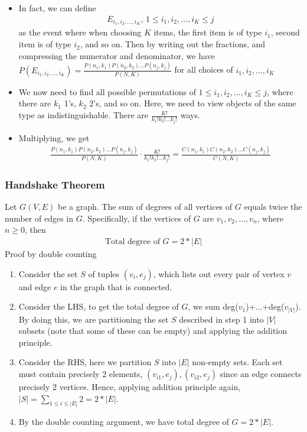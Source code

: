 \documentclass{article}
\begin{document}
\begin{enumerate}
\begin{itemize}
        \item In fact, we can define \begin{align*}
            E_{i_1,i_2,\dots,i_K},\, 1\leq i_1,i_2,\dots,i_K\leq j
        \end{align*} as the event where when choosing $K$ items, the first item is of type $i_1$, second item is of type $i_2$, and so on. Then by writing out the fractions, and compressing the numerator and denominator, we have $P(E_{i_1,i_2,\dots,i_K})=\frac{P(n_1,k_1)P(n_2,k_2)\dots P(n_j,k_j)}{P(N,K)}$ for all choices of $i_1,i_2,\dots,i_K$
        \item We now need to find all possible permutations of $1\leq i_1,i_2,\dots,i_K\leq j$, where there are $k_1$ 1's, $k_2$ 2's, and so on. Here, we need to view objects of the same type as indistinguishable. There are $\frac{K!}{k_1!k_2!\dots k_j!}$ ways.
        \item Multiplying, we get \begin{align*}
            \frac{P(n_1,k_1)P(n_2,k_2)\dots P(n_j,k_j)}{P(N,K)}\cdot \frac{K!}{k_1!k_2!\dots k_j!}=\frac{C(n_1, k_1)  C(n_2, k_2) \dots  C(n_j, k_j)}{C(N, K)}
        \end{align*}
    \end{itemize}
\end{enumerate}

\subsubsection{Handshake Theorem}
Let $G(V,E)$ be a graph. The sum of degrees of all vertices of $G$ equals twice the number of edges in $G$. Specifically, if the vertices of $G$ are $v_1,v_2,\dots ,v_n$, where $n\geq 0$, then
\begin{align*}
    \text{Total degree of } G=2*|E|
\end{align*}
Proof by double counting
\begin{enumerate}
    \item Consider the set $S$ of tuples $(v_i,e_j)$, which lists out every pair of vertex $v$ and edge $e$ in the graph that is connected.
    \item Consider the LHS, to get the total degree of $G$, we sum deg($v_1$)+...+deg($v_{|V|}$). By doing this, we are partitioning the set $S$ described in step 1 into $|V|$ subsets (note that some of these can be empty) and applying the addition principle.
    \item Consider the RHS, here we partition $S$ into $|E|$ non-empty sets. Each set must contain precisely 2 elements, $(v_{i1},e_j),(v_{i2},e_j)$ since an edge connects precisely 2 vertices. Hence, applying addition principle again, $|S|=\sum_{1\leq i\leq |E|}2=2*|E|$.
    \item By the double counting argument, we have total degree of $G=2*|E|$.
\end{enumerate}
\end{document}
